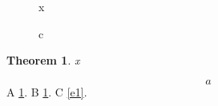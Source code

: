 \documentclass{article}
\newtheorem{theorem}{Theorem}
\begin{document}
\begin{figure}x\caption{c}\label{f1}\end{figure}
\begin{theorem}\label{t1}x\end{theorem}
\begin{equation}a\label{e1}\end{equation}
A \cref{f1}. B \cref{t1}. C \cref{e1}.
\end{document}
